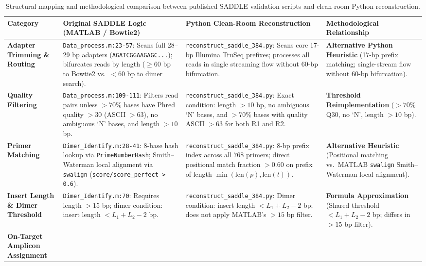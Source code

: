 \documentclass[
]{article}
\begin{document}
\begin{table}[htbp]
\centering
\small
\caption{Structural mapping and methodological comparison between published SADDLE validation scripts and clean-room Python reconstruction.}
\label{tab:code_mapping}
\begin{tabularx}{\textwidth}{@{} >{\bfseries}p{2.8cm} >{\raggedright}p{4.4cm} >{\raggedright}p{4.4cm} >{\raggedright\arraybackslash}X @{}}
\toprule
Category & Original SADDLE Logic (MATLAB / Bowtie2) & Python Clean-Room Reconstruction & Methodological Relationship \\
\midrule
Adapter Trimming \& Routing &
\texttt{Data\_process.m:23-57}: Scans full 28--29 bp adapters (\texttt{AGATCGGAAGAGC...}); bifurcates reads by length ($\ge 60$ bp to Bowtie2 vs.\ $< 60$ bp to dimer search). &
\texttt{reconstruct\_saddle\_384.py}: Scans core 17-bp Illumina TruSeq prefixes; processes all reads in single streaming flow without 60-bp bifurcation. &
\textbf{Alternative Python Heuristic} (17-bp prefix matching; single-stream flow without 60-bp bifurcation). \\
\addlinespace
Quality Filtering &
\texttt{Data\_process.m:109-111}: Filters read pairs unless $>70\%$ bases have Phred quality $>30$ (ASCII $>63$), no ambiguous `N' bases, and length $>10$ bp. &
\texttt{reconstruct\_saddle\_384.py}: Exact condition: length $>10$ bp, no ambiguous `N' bases, and $>70\%$ bases with quality ASCII $>63$ for both R1 and R2. &
\textbf{Threshold Reimplementation} ($>70\%$ Q30, no `N', length $>10$ bp). \\
\addlinespace
Primer Matching &
\texttt{Dimer\_Identify.m:28-41}: 8-base hash lookup via \texttt{PrimeNumberHash}; Smith--Waterman local alignment via \texttt{swalign} (\texttt{score/score\_perfect > 0.6}). &
\texttt{reconstruct\_saddle\_384.py}: 8-bp prefix index across all 768 primers; direct positional match fraction $>0.60$ on prefix of length $\min(\text{len}(p), \text{len}(t))$. &
\textbf{Alternative Heuristic} (Positional matching vs.\ MATLAB \texttt{swalign} Smith--Waterman local alignment). \\
\addlinespace
Insert Length \& Dimer Threshold &
\texttt{Dimer\_Identify.m:70}: Requires length $>15$ bp; dimer condition: insert length $< L_1 + L_2 - 2$ bp. &
\texttt{reconstruct\_saddle\_384.py}: Dimer condition: insert length $< L_1 + L_2 - 2$ bp; does not apply MATLAB's $>15$ bp filter. &
\textbf{Formula Approximation} (Shared threshold $< L_1 + L_2 - 2$ bp; differs in $>15$ bp filter). \\
\addlinespace
On-Target Amplicon Assignment &

\end{tabularx}
\end{table}
\end{document}

